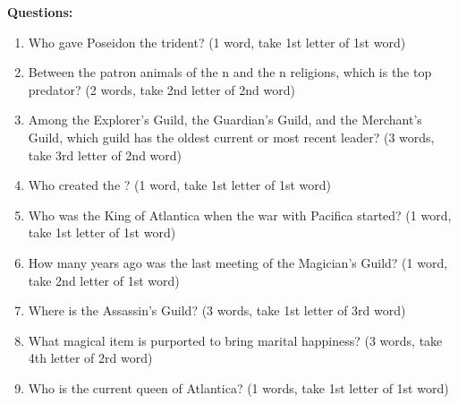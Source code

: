 \documentclass[green]{NeptuneBall}
\begin{document}
{\bf Questions:}
\begin{enumerate}
 \item Who gave Poseidon the trident? (1 word, take 1st letter of 1st word) \vspace{3 mm}\\  \underline{\hspace{15cm}}
 \item Between the patron animals of the \pPacifica{}n and the \pAtlantis{}n religions, which is the top predator? (2 words, take 2nd letter of 2nd word) \vspace{3 mm}\\ \underline{\hspace{15cm}}
	\item Among the Explorer's Guild, the Guardian's Guild, and the Merchant's Guild, which guild has the oldest current or most recent leader? (3 words, take 3rd letter of 2nd word) \vspace{3 mm}\\ \underline{\hspace{15cm}}
	\item Who created the \sArtifactTwo{}? (1 word, take 1st letter of 1st word) \vspace{3 mm}\\ \underline{\hspace{15cm}}
	\item Who was the King of Atlantica when the war with Pacifica started? (1 word, take 1st letter of 1st word) \vspace{3 mm}\\ \underline{\hspace{15cm}}
	\item How many years ago was the last meeting of the Magician's Guild? (1 word, take 2nd letter of 1st word) \vspace{3 mm}\\ \underline{\hspace{15cm}}
	\item Where is the Assassin's Guild? (3 words, take 1st letter of 3rd word) \vspace{3 mm}\\ \underline{\hspace{15cm}}
	\item What magical item is purported to bring marital happiness? (3 words, take 4th letter of 2rd word) \vspace{3 mm}\\ \underline{\hspace{15cm}}
	\item Who is the current queen of Atlantica? (1 words, take 1st letter of 1st word) \vspace{3 mm}\\ \underline{\hspace{15cm}}

\end{enumerate}
\end{document}
